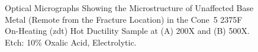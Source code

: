 \begin{figure}
\centering
{}


\caption{Optical Micrographs Showing the Microstructure of Unaffected Base Metal (Remote from the Fracture Location) in the Cone~5 2375\textdegree{}F On-Heating (\gls{zdt}) Hot Ductility Sample at (A) 200X and (B) 500X.  Etch: 10\% Oxalic Acid, Electrolytic.}
\label{fig:c5-oh-2375-remote}
\end{figure}



